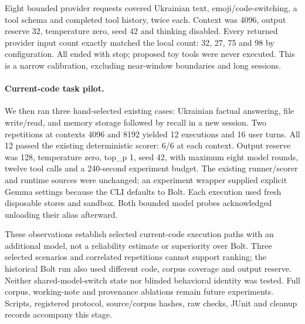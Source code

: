 Eight bounded provider requests covered Ukrainian text, emoji/code-switching, a tool schema and completed tool history, twice each. Context was 4096, output reserve 32, temperature zero, seed 42 and thinking disabled. Every returned provider input count exactly matched the local count: 32, 27, 75 and 98 by configuration. All ended with stop; proposed toy tools were never executed. This is a narrow calibration, excluding near-window boundaries and long sessions.

\paragraph{Current-code task pilot.}
We then ran three hand-selected existing cases: Ukrainian factual answering, file write/read, and memory storage followed by recall in a new session. Two repetitions at contexts 4096 and 8192 yielded 12 executions and 16 user turns. All 12 passed the existing deterministic scorer: 6/6 at each context. Output reserve was 128, temperature zero, top\_p 1, seed 42, with maximum eight model rounds, twelve tool calls and a 240-second experiment budget. The existing runner/scorer and runtime sources were unchanged; an experiment wrapper supplied explicit Gemma settings because the CLI defaults to Bolt. Each execution used fresh disposable stores and sandbox. Both bounded model probes acknowledged unloading their alias afterward.

These observations establish selected current-code execution paths with an additional model, not a reliability estimate or superiority over Bolt. Three selected scenarios and correlated repetitions cannot support ranking; the historical Bolt run also used different code, corpus coverage and output reserve. Neither shared-model-switch state nor blinded behavioral identity was tested. Full corpus, working-note and provenance ablations remain future experiments. Scripts, registered protocol, source/corpus hashes, raw checks, JUnit and cleanup records accompany this stage.

